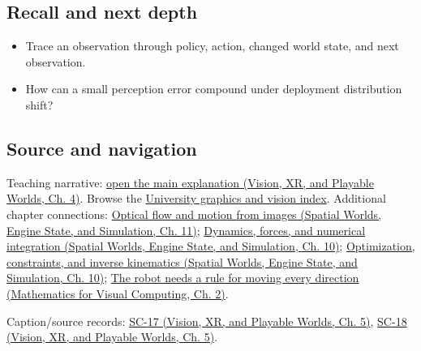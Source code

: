 \subsection{Recall and next depth}\label{appendix-b0c42da325f1-recall-and-next-depth}

\begin{itemize}
\tightlist
\item
  Trace an observation through policy, action, changed world state, and next observation.
\item
  How can a small perception error compound under deployment distribution shift?
\end{itemize}

\subsection{Source and navigation}\label{appendix-b0c42da325f1-source-and-navigation}

Teaching narrative: \href{../07-Vision-XR-and-Playable-Worlds/main.pdf\#nameddest=04-visual-computing-ii-ch034-robot-learning-closes-the-perception-action-loop}{open the main explanation (Vision, XR, and Playable Worlds, Ch. 4)}. Browse the \hyperref[appendix-a6d556a4ef50-university-graphics-vision-and-photography---independent-series]{University graphics and vision index}. Additional chapter connections: \href{../05-Spatial-Worlds-Engine-State-and-Simulation/main.pdf\#nameddest=04-visual-computing-ii-ch030-optical-flow-and-motion-from-images}{Optical flow and motion from images (Spatial Worlds, Engine State, and Simulation, Ch. 11)}; \href{../05-Spatial-Worlds-Engine-State-and-Simulation/main.pdf\#nameddest=04-visual-computing-ii-ch029-dynamics-forces-and-numerical-integration}{Dynamics, forces, and numerical integration (Spatial Worlds, Engine State, and Simulation, Ch. 10)}; \href{../05-Spatial-Worlds-Engine-State-and-Simulation/main.pdf\#nameddest=04-visual-computing-ii-ch029-optimization-constraints-and-inverse-kinematics}{Optimization, constraints, and inverse kinematics (Spatial Worlds, Engine State, and Simulation, Ch. 10)}; \href{../02-Mathematics-for-Visual-Computing/main.pdf\#nameddest=01-foundations-i-ch018-the-robot-needs-a-rule-for-moving-every-direction}{The robot needs a rule for moving every direction (Mathematics for Visual Computing, Ch. 2)}.

Caption/source records: \href{../07-Vision-XR-and-Playable-Worlds/main.pdf\#nameddest=04-visual-computing-ii-ch036-sc-17---stanford-cs231n-deep-learning-for-computer-vision-spring-2025-lecture-17-robot-learning}{SC-17 (Vision, XR, and Playable Worlds, Ch. 5)}, \href{../07-Vision-XR-and-Playable-Worlds/main.pdf\#nameddest=04-visual-computing-ii-ch036-sc-18---stanford-cs231n-deep-learning-for-computer-vision-spring-2025-lecture-18-human-centered-ai}{SC-18 (Vision, XR, and Playable Worlds, Ch. 5)}.
